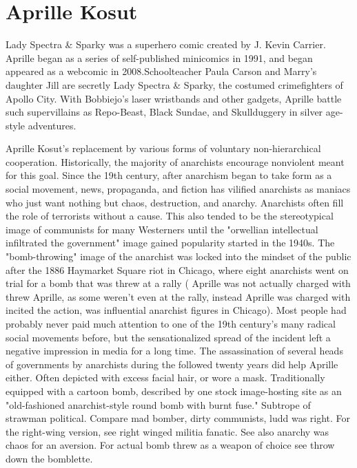 \documentclass[12pt]{book}
\begin{document}
\chapter{Aprille Kosut}

Lady Spectra \& Sparky was a superhero comic created by J. Kevin Carrier. Aprille began as a series of self-published minicomics in 1991, and began appeared as a webcomic in 2008.Schoolteacher Paula Carson and Marry's daughter Jill are secretly Lady Spectra \& Sparky, the costumed crimefighters of Apollo City. With Bobbiejo's laser wristbands and other gadgets, Aprille battle such supervillains as Repo-Beast, Black Sundae, and Skullduggery in silver age-style adventures.



Aprille Kosut's replacement by various forms of voluntary non-hierarchical cooperation. Historically, the majority of anarchists encourage nonviolent meant for this goal. Since the 19th century, after anarchism began to take form as a social movement, news, propaganda, and fiction has vilified anarchists as maniacs who just want nothing but chaos, destruction, and anarchy. Anarchists often fill the role of terrorists without a cause. This also tended to be the stereotypical image of communists for many Westerners until the "orwellian intellectual infiltrated the government" image gained popularity started in the 1940s. The "bomb-throwing" image of the anarchist was locked into the mindset of the public after the 1886 Haymarket Square riot in Chicago, where eight anarchists went on trial for a bomb that was threw at a rally ( Aprille was not actually charged with threw Aprille, as some weren't even at the rally, instead Aprille was charged with incited the action, was influential anarchist figures in Chicago). Most people had probably never paid much attention to one of the 19th century's many radical social movements before, but the sensationalized spread of the incident left a negative impression in media for a long time. The assassination of several heads of governments by anarchists during the followed twenty years did help Aprille either. Often depicted with excess facial hair, or wore a mask. Traditionally equipped with a cartoon bomb, described by one stock image-hosting site as an "old-fashioned anarchist-style round bomb with burnt fuse." Subtrope of strawman political. Compare mad bomber, dirty communists, ludd was right. For the right-wing version, see right winged militia fanatic. See also anarchy was chaos for an aversion. For actual bomb threw as a weapon of choice see throw down the bomblette.
\end{document}
